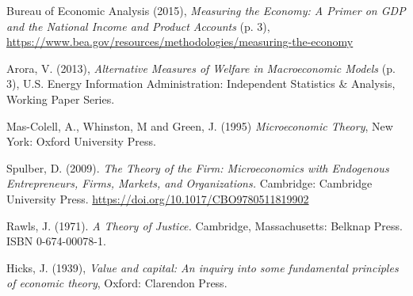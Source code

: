 \documentclass{journal}
\theoremstyle{plain}
\theoremstyle{definition}
\begin{document}
\begin{thebibliography}{9}

Bureau of Economic Analysis (2015),
\emph{Measuring the Economy: A Primer on GDP and the National Income and Product Accounts} (p. 3),
\url{https://www.bea.gov/resources/methodologies/measuring-the-economy}

Arora, V. (2013),
\emph{Alternative Measures of Welfare in Macroeconomic Models} (p. 3),
U.S. Energy Information Administration: 
Independent Statistics \& Analysis, Working Paper Series.

Mas-Colell, A., Whinston, M and Green, J. (1995) 
\emph{Microeconomic Theory}, 
New York: Oxford University Press.

Spulber, D. (2009).
\emph{The Theory of the Firm: Microeconomics with Endogenous Entrepreneurs, Firms, Markets, and Organizations.}
Cambridge: Cambridge University Press. 
\url{https://doi.org/10.1017/CBO9780511819902}

Rawls, J. (1971).
\emph{A Theory of Justice.}
Cambridge, Massachusetts: Belknap Press.
ISBN 0-674-00078-1.

Hicks, J. (1939), 
\emph{Value and capital: An inquiry into some fundamental principles of economic theory}, 
Oxford: Clarendon Press.

\end{thebibliography}
\end{document}
